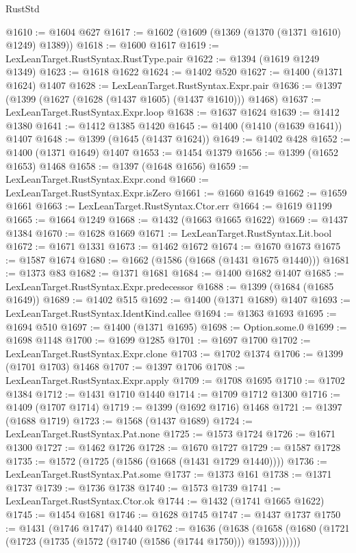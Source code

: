 \begin{lexlean}{RustStd}
\begin{coremodule}
@1610 := @1604 @627
@1617 := @1602 (@1609 (@1369 (@1370 (@1371 @1610) @1249) @1389))
@1618 := @1600 @1617
@1619 := LexLeanTarget.RustSyntax.RustType.pair
@1622 := @1394 (@1619 @1249 @1349)
@1623 := @1618 @1622
@1624 := @1402 @520
@1627 := @1400 (@1371 @1624) @1407
@1628 := LexLeanTarget.RustSyntax.Expr.pair
@1636 := @1397 (@1399 (@1627 (@1628 (@1437 @1605) (@1437 @1610))) @1468)
@1637 := LexLeanTarget.RustSyntax.Expr.loop
@1638 := @1637 @1624
@1639 := @1412 @1380
@1641 := @1412 @1385 @1420
@1645 := @1400 (@1410 (@1639 @1641)) @1407
@1648 := @1399 (@1645 (@1437 @1624))
@1649 := @1402 @428
@1652 := @1400 (@1371 @1649) @1407
@1653 := @1454 @1379
@1656 := @1399 (@1652 @1653) @1468
@1658 := @1397 (@1648 @1656)
@1659 := LexLeanTarget.RustSyntax.Expr.cond
@1660 := LexLeanTarget.RustSyntax.Expr.isZero
@1661 := @1660 @1649
@1662 := @1659 @1661
@1663 := LexLeanTarget.RustSyntax.Ctor.err
@1664 := @1619 @1199
@1665 := @1664 @1249
@1668 := @1432 (@1663 @1665 @1622)
@1669 := @1437 @1384
@1670 := @1628 @1669
@1671 := LexLeanTarget.RustSyntax.Lit.bool
@1672 := @1671 @1331
@1673 := @1462 @1672
@1674 := @1670 @1673
@1675 := @1587 @1674
@1680 := @1662 (@1586 (@1668 (@1431 @1675 @1440)))
@1681 := @1373 @83
@1682 := @1371 @1681
@1684 := @1400 @1682 @1407
@1685 := LexLeanTarget.RustSyntax.Expr.predecessor
@1688 := @1399 (@1684 (@1685 @1649))
@1689 := @1402 @515
@1692 := @1400 (@1371 @1689) @1407
@1693 := LexLeanTarget.RustSyntax.IdentKind.callee
@1694 := @1363 @1693
@1695 := @1694 @510
@1697 := @1400 (@1371 @1695)
@1698 := Option.some.{0}
@1699 := @1698 @1148
@1700 := @1699 @1285
@1701 := @1697 @1700
@1702 := LexLeanTarget.RustSyntax.Expr.clone
@1703 := @1702 @1374
@1706 := @1399 (@1701 @1703) @1468
@1707 := @1397 @1706
@1708 := LexLeanTarget.RustSyntax.Expr.apply
@1709 := @1708 @1695
@1710 := @1702 @1384
@1712 := @1431 @1710 @1440
@1714 := @1709 @1712 @1300
@1716 := @1409 (@1707 @1714)
@1719 := @1399 (@1692 @1716) @1468
@1721 := @1397 (@1688 @1719)
@1723 := @1568 (@1437 @1689)
@1724 := LexLeanTarget.RustSyntax.Pat.none
@1725 := @1573 @1724
@1726 := @1671 @1300
@1727 := @1462 @1726
@1728 := @1670 @1727
@1729 := @1587 @1728
@1735 := @1572 (@1725 (@1586 (@1668 (@1431 @1729 @1440))))
@1736 := LexLeanTarget.RustSyntax.Pat.some
@1737 := @1373 @161
@1738 := @1371 @1737
@1739 := @1736 @1738
@1740 := @1573 @1739
@1741 := LexLeanTarget.RustSyntax.Ctor.ok
@1744 := @1432 (@1741 @1665 @1622)
@1745 := @1454 @1681
@1746 := @1628 @1745
@1747 := @1437 @1737
@1750 := @1431 (@1746 @1747) @1440
@1762 := @1636
    (@1638 (@1658 (@1680 (@1721 (@1723 (@1735 (@1572 (@1740 (@1586 (@1744 @1750))) @1593)))))))

\end{coremodule}
\end{lexlean}
